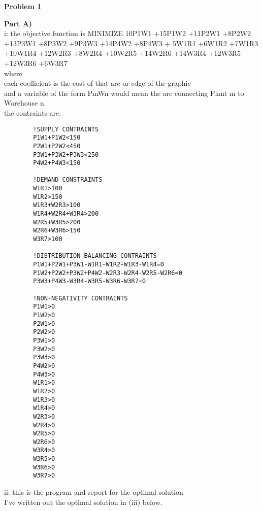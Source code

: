 \documentclass[12pt]{report}
\begin{document}
  
\singlespacing

\textbf{Problem 1}

\textbf{Part A)}\\

i: the objective function is MINIMIZE 10P1W1 +15P1W2 +11P2W1 +8P2W2 +13P3W1 +8P3W2 +9P3W3 +14P4W2 +8P4W3 
+
5W1R1 +6W1R2 +7W1R3 +10W1R4 +12W2R3 +8W2R4 +10W2R5 +14W2R6 +14W3R4 +12W3R5 +12W3R6 +6W3R7\\ 
where \\
each coefficient is the cost of that arc or edge of the graphic\\
and a variable of the form PmWn would mean the arc connecting Plant m to Warehouse n.\\

the contraints are:\\
\begin{verbatim}
        !SUPPLY CONTRAINTS
        P1W1+P1W2<150
        P2W1+P2W2<450
        P3W1+P3W2+P3W3<250
        P4W2+P4W3<150

        !DEMAND CONSTRAINTS
        W1R1>100
        W1R2>150
        W1R3+W2R3>100
        W1R4+W2R4+W3R4>200
        W2R5+W3R5>200
        W2R6+W3R6>150
        W3R7>100        

        !DISTRIBUTION BALANCING CONTRAINTS
        P1W1+P2W1+P3W1-W1R1-W1R2-W1R3-W1R4=0
        P1W2+P2W2+P3W2+P4W2-W2R3-W2R4-W2R5-W2R6=0
        P3W3+P4W3-W3R4-W3R5-W3R6-W3R7=0

        !NON-NEGATIVITY CONTRAINTS
        P1W1>0
        P1W2>0
        P2W1>0
        P2W2>0
        P3W1>0
        P3W2>0
        P3W3>0
        P4W2>0
        P4W3>0
        W1R1>0
        W1R2>0
        W1R3>0
        W1R4>0
        W2R3>0
        W2R4>0
        W2R5>0
        W2R6>0
        W3R4>0
        W3R5>0
        W3R6>0
        W3R7>0
\end{verbatim}

ii: this is the program and report for the optimal solution\\
I've written out the optimal solution in (iii) below.\\
\end{document}
